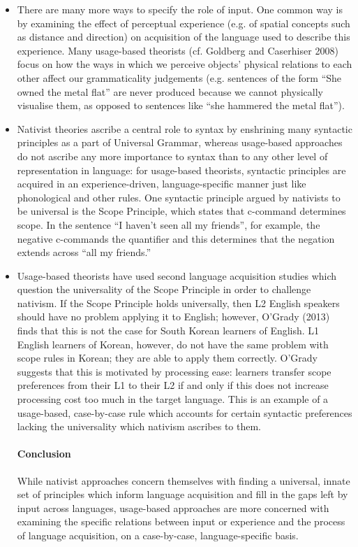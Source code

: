 \documentclass{article}
\begin{document}
\begin{itemize}
    \item There are many more ways to specify the role of input. One common way is by examining the effect of perceptual experience (e.g. of spatial concepts such as distance and direction) on acquisition of the language used to describe this experience. Many usage-based theorists (cf. Goldberg and Caserhiser 2008) focus on how the ways in which we perceive objects’ physical relations to each other affect our grammaticality judgements (e.g. sentences of the form “She owned the metal flat” are never produced because we cannot physically visualise them, as opposed to sentences like “she hammered the metal flat”).
    \item Nativist theories ascribe a central role to syntax by enshrining many syntactic principles as a part of Universal Grammar, whereas usage-based approaches do not ascribe any more importance to syntax than to any other level of representation in language: for usage-based theorists, syntactic principles are acquired in an experience-driven, language-specific manner just like phonological and other rules. One syntactic principle argued by nativists to be universal is the Scope Principle, which states that c-command determines scope. In the sentence “I haven’t seen all my friends”, for example, the negative c-commands the quantifier and this determines that the negation extends across “all my friends.” 
    \item Usage-based theorists have used second language acquisition studies which question the universality of the Scope Principle in order to challenge nativism. If the Scope Principle holds universally, then L2 English speakers should have no problem applying it to English; however, O’Grady (2013) finds that this is not the case for South Korean learners of English. L1 English learners of Korean, however, do not have the same problem with scope rules in Korean; they are able to apply them correctly. O’Grady suggests that this is motivated by processing ease: learners transfer scope preferences from their L1 to their L2 if and only if this does not increase processing cost too much in the target language. This is an example of a usage-based, case-by-case rule which accounts for certain syntactic preferences lacking the universality which nativism ascribes to them. 
\paragraph{Conclusion} While nativist approaches concern themselves with finding a universal, innate set of principles which inform language acquisition and fill in the gaps left by input across languages, usage-based approaches are more concerned with examining the specific relations between input or experience and the process of language acquisition, on a case-by-case, language-specific basis. 
\end{itemize}
\end{document}
